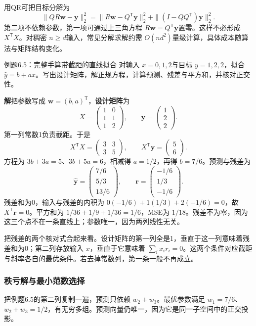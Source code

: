 \documentclass[UTF8,fontset=none,zihao=-4,a4paper]{ctexart}
\newcommand{\term}[1]{\textbf{#1}}
\newcommand{\sol}{\par\noindent\textbf{解}\quad}
\numberwithin{equation}{section}
\numberwithin{figure}{section}
\begin{document}
用QR可把目标分解为
\[
 \|QR\symbf w-\symbf y\|_2^2
 =\|R\symbf w-Q^{\mathsf T}\symbf y\|_2^2
 +\|(I-QQ^{\mathsf T})\symbf y\|_2^2.
\]
第二项不依赖参数，第一项可通过上三角方程 $R\symbf w=Q^{\mathsf T}\symbf y$置零。这样不必形成 $X^{\mathsf T}X$。对稠密 $n\ge d$输入，常见分解求解约需 $O(nd^2)$量级计算，具体成本随算法与矩阵结构变化。

\begin{infobox}{例题6.5：完整手算带截距的直线拟合}
对输入 $x=0,1,2$与目标 $y=1,2,2$，拟合 $\widehat y=b+ax$。写出设计矩阵，解正规方程，计算预测、残差与平方和，并核对正交性。
\end{infobox}
\sol 把参数写成 $\symbf w=(b,a)^{\mathsf T}$，\term{设计矩阵}为
\[
 X=\begin{pmatrix}1&0\\1&1\\1&2\end{pmatrix},\qquad
 \symbf y=\begin{pmatrix}1\\2\\2\end{pmatrix}.
\]
第一列常数1负责截距。于是
\[
 X^{\mathsf T}X=\begin{pmatrix}3&3\\3&5\end{pmatrix},\qquad
 X^{\mathsf T}\symbf y=\begin{pmatrix}5\\6\end{pmatrix}.
\]
方程为 $3b+3a=5$、$3b+5a=6$，相减得 $a=1/2$，再得 $b=7/6$。预测与残差为
\[
 \widehat{\symbf y}=\begin{pmatrix}7/6\\5/3\\13/6\end{pmatrix},\qquad
 \symbf r=\begin{pmatrix}-1/6\\1/3\\-1/6\end{pmatrix}.
\]
残差和为0，输入与残差的内积为 $0(-1/6)+1(1/3)+2(-1/6)=0$，故 $X^{\mathsf T}\symbf r=0$。平方和为 $1/36+1/9+1/36=1/6$，MSE为 $1/18$。残差不为零，因为这三个点不在一条直线上；参数唯一，因为两列线性无关。

把残差的两个核对式合起来看。设计矩阵的第一列全是1，垂直于这一列意味着残差和为0；第二列存放输入 $x$，垂直于它意味着 $\sum_i x_i r_i=0$。这两个条件对应截距与斜率各自的最优条件。若去掉常数列，第一条一般不再成立。

\subsubsection{秩亏解与最小范数选择}
把例题6.5的第二列复制一遍，预测只依赖 $w_2+w_3$。最优参数满足 $w_1=7/6$、$w_2+w_3=1/2$，有无穷多组。预测向量仍唯一，因为它是同一子空间中的正交投影。
\end{document}
